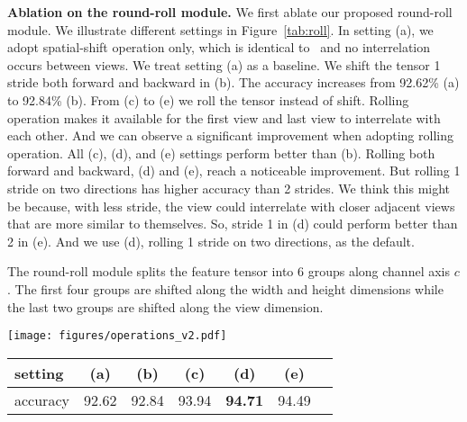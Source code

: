 \documentclass[11pt]{article}
\begin{document}
\vspace{0.2in}\noindent\textbf{Ablation on the round-roll module.} We first ablate our proposed round-roll module. We illustrate different settings in Figure~\ref{tab:roll}. In setting (a), we adopt spatial-shift operation only, which is identical to~\citet{yu2022s2mlp} and no interrelation occurs between views. We treat setting (a) as a baseline. We shift the tensor 1 stride both forward and backward in (b). The accuracy increases from 92.62\% (a) to 92.84\% (b). From (c) to (e) we roll the tensor instead of shift. Rolling operation makes it available for the first view and last view to interrelate with each other. And we can observe a significant improvement when adopting rolling operation. All (c), (d), and (e) settings perform better than (b). Rolling both forward and backward, (d) and (e), reach a noticeable improvement. But rolling 1 stride on two directions has higher accuracy than 2 strides. We think this might be because, with less stride, the view could interrelate with closer adjacent views that are more similar to themselves. So, stride 1 in (d) could perform better than 2 in (e). And we use (d), rolling 1 stride on two directions, as the default.

The round-roll module splits the feature tensor into 6 groups along channel axis $c$. The first four groups are shifted along the width and height dimensions while the last two groups are shifted along the view dimension.



\begin{figure*}[t!]
\centering
\texttt{[image: figures/operations\_v2.pdf]}

\begin{tabular}{lcccccc}
\toprule
setting & (a) & (b) & (c) & (d) & (e) \\
\midrule
accuracy  & 92.62 & 92.84 & 93.94 & \textbf{94.71} & 94.49 \\
\bottomrule
\end{tabular}

\vspace{0.1in}

\caption{The different settings to ablate the round-roll module. (a) spatial-shift only and no interrelation between views; (b) shift 1 stride both forward and backward; (c) roll 1 stride forward; (d) roll 1 stride both forward and backward; (e) roll 2 strides both forward and backward. We observe that the best performance is (d) when rolling feature tensor along view dimension 1 stride forward and backward.} \label{tab:roll}\vspace{0.1in}
\end{figure*}
\end{document}
